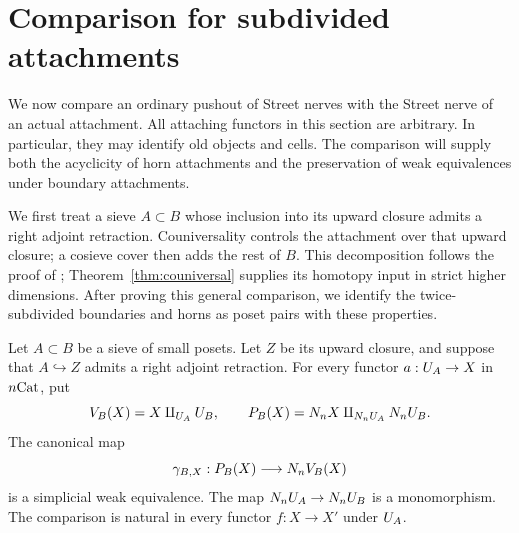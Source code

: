 \section{Comparison for subdivided attachments}
\label{sec:attachments}

We now compare an ordinary pushout of Street nerves with the Street
nerve of an actual attachment.  All attaching functors in this section
are arbitrary.  In particular, they may identify old objects and cells.
The comparison will supply both the acyclicity of horn attachments and
the preservation of weak equivalences under boundary attachments.

We first treat a sieve $A\subset B$ whose inclusion into its upward
closure admits a right adjoint retraction.  Couniversality controls
the attachment over that upward closure; a cosieve cover then adds
the rest of $B$.  This decomposition follows the proof of
\cite[Proposition~4.3]{Thomason1980}; Theorem~\ref{thm:couniversal}
supplies its homotopy input in strict higher dimensions.  After proving
this general comparison, we identify the twice-subdivided boundaries
and horns as poset pairs with these properties.

\begin{proposition}
\label{prop:attachment-comparison}
Let $A\subset B$ be a sieve of small posets.  Let $Z$ be its upward
closure, and suppose that $A\hookrightarrow Z$ admits a right adjoint
retraction.  For every functor $a:U_{A}\to X$ in $n\mathrm{Cat}$, put
\[
 V_B(X)=X\amalg_{U_{A}}U_{B},\qquad
 P_B(X)=N_n X\amalg_{N_nU_{A}}N_nU_{B}.
\]
The canonical map
\begin{equation}
 \gamma_{B,X}:P_B(X)\longrightarrow N_n V_B(X)
 \label{eq:attachment-comparison}
\end{equation}
is a simplicial weak equivalence.  The map
$N_nU_{A}\to N_nU_{B}$ is a monomorphism.
The comparison is natural in every functor $f:X\to X'$ under
$U_{A}$.
\end{proposition}

